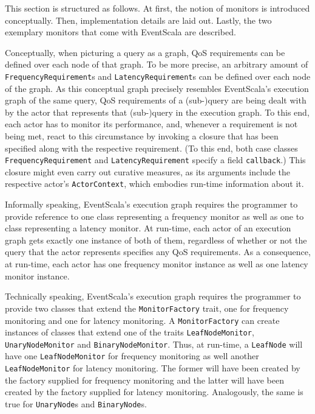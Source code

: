 \documentclass[article, type=bsc, colorback, accentcolor=tud8b, parskip=half, bibliography=totocnumbered]{tudthesis}
\begin{document}
This section is structured as follows.
At first, the notion of monitors is introduced conceptually.
Then, implementation details are laid out.
Lastly, the two exemplary monitors that come with EventScala are described.

Conceptually, when picturing a query as a graph, QoS requirements can be defined over each node of that graph.
To be more precise, an arbitrary amount of \lstinline{FrequencyRequirement}s and \lstinline{LatencyRequirement}s can be defined over each node of the graph.
As this conceptual graph precisely resembles EventScala's execution graph of the same query, QoS requirements of a (sub-)query are being dealt with by the actor that represents that (sub-)query in the execution graph.
To this end, each actor has to monitor its performance, and, whenever a requirement is not being met, react to this circumstance by invoking a closure that has been specified along with the respective requirement.
(To this end, both case classes \lstinline{FrequencyRequirement} and \lstinline{LatencyRequirement} specify a field \lstinline{callback}.)
This closure might even carry out curative measures, as its arguments include the respective actor's \lstinline{ActorContext}, which embodies run-time information about it.

Informally speaking, EventScala's execution graph requires the programmer to provide reference to one class representing a frequency monitor as well as one to class representing a latency monitor.
At run-time, each actor of an execution graph gets exactly one instance of both of them, regardless of whether or not the query that the actor represents specifies any QoS requirements.
As a consequence, at run-time, each actor has one frequency monitor instance as well as one latency monitor instance.

Technically speaking, EventScala's execution graph requires the programmer to provide two classes that extend the \lstinline{MonitorFactory} trait, one for frequency monitoring and one for latency monitoring.
A \lstinline{MonitorFactory} can create instances of classes that extend one of the traits \lstinline{LeafNodeMonitor}, \lstinline{UnaryNodeMonitor} and \lstinline{BinaryNodeMonitor}.
Thus, at run-time, a \lstinline{LeafNode} will have one \lstinline{LeafNodeMonitor} for frequency monitoring as well another \lstinline{LeafNodeMonitor} for latency monitoring.
The former will have been created by the factory supplied for frequency monitoring and the latter will have been created by the factory supplied for latency monitoring.
Analogously, the same is true for \lstinline{UnaryNode}s and \lstinline{BinaryNode}s.
\end{document}
